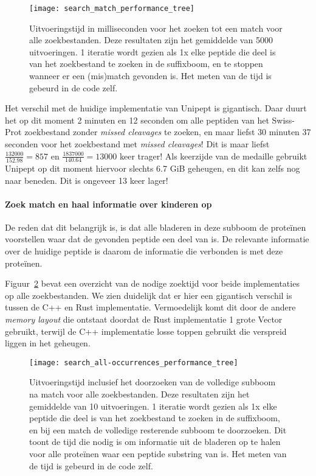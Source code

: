 \begin{figure}[H]
    \centering
    \texttt{[image: search\_match\_performance\_tree]}
    \caption{Uitvoeringstijd in milliseconden voor het zoeken tot een match voor alle zoekbestanden. Deze resultaten zijn het gemiddelde van 5000 uitvoeringen. 1 iteratie wordt gezien als 1x elke peptide die deel is van het zoekbestand te zoeken in de suffixboom, en te stoppen wanneer er een (mis)match gevonden is. Het meten van de tijd is gebeurd in de code zelf.}
    \label{fig:performance_match_tree}
\end{figure}

Het verschil met de huidige implementatie van Unipept is gigantisch.
Daar duurt het op dit moment 2 minuten en 12 seconden om alle peptiden van het Swiss-Prot zoekbestand zonder \textit{missed cleavages} te zoeken,
en maar liefst 30 minuten 37 seconden voor het zoekbestand met \textit{missed cleavages}!
Dit is maar liefst $\frac{132 000}{152.98} = 857$ en $\frac{1 837 000}{140.64} = 13 000$ keer trager!
Als keerzijde van de medaille gebruikt Unipept op dit moment hiervoor slechts 6.7 GiB geheugen, en dit kan zelfs nog naar beneden.
Dit is ongeveer 13 keer lager!

\paragraph{Zoek match en haal informatie over kinderen op}
De reden dat dit belangrijk is, is dat alle bladeren in deze subboom de proteïnen voorstellen waar dat de gevonden peptide een deel van is.
De relevante informatie over de huidige peptide is daarom de informatie die verbonden is met deze proteïnen.

Figuur~\ref{fig:performance_all-occurrences_tree} bevat een overzicht van de nodige zoektijd voor beide implementaties op alle zoekbestanden.
We zien duidelijk dat er hier een gigantisch verschil is tussen de C++ en Rust implementatie.
Vermoedelijk komt dit door de andere \textit{memory layout} die ontstaat doordat de Rust implementatie 1 grote Vector gebruikt, terwijl de C++ implementatie losse toppen gebruikt die verspreid liggen in het geheugen.

\begin{figure}[H]
    \centering
    \texttt{[image: search\_all-occurrences\_performance\_tree]}
    \caption{Uitvoeringstijd inclusief het doorzoeken van de volledige subboom na match voor alle zoekbestanden. Deze resultaten zijn het gemiddelde van 10 uitvoeringen. 1 iteratie wordt gezien als 1x elke peptide die deel is van het zoekbestand te zoeken in de suffixboom, en bij een match de volledige resterende subboom te doorzoeken. Dit toont de tijd die nodig is om informatie uit de bladeren op te halen voor alle proteïnen waar een peptide substring van is. Het meten van de tijd is gebeurd in de code zelf.}
    \label{fig:performance_all-occurrences_tree}
\end{figure}


